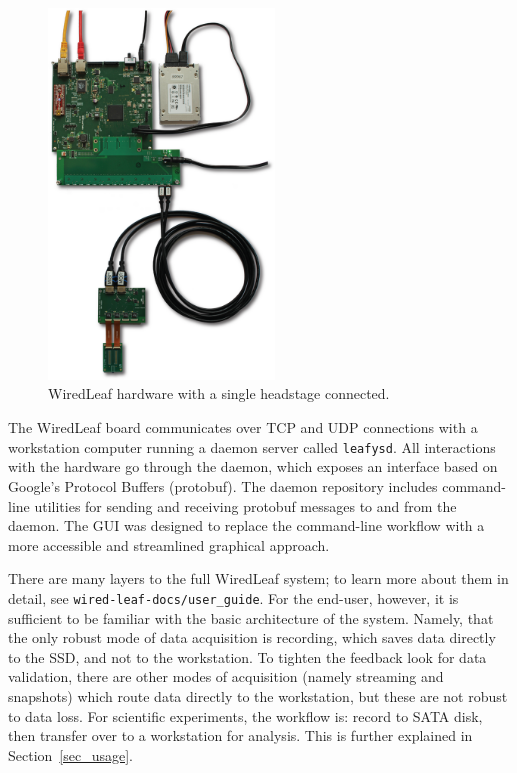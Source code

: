 \begin{figure}[h!]
\begin{center}
\includegraphics[width=6cm]{screenshots/full_setup.png}
\end{center}
\caption{WiredLeaf hardware with a single headstage connected.}
\label{fig_hw}
\end{figure}

The WiredLeaf board communicates over TCP and UDP connections with a workstation computer running a daemon server called \texttt{leafysd}. All interactions with the hardware go through the daemon, which exposes an interface based on Google's Protocol Buffers (protobuf). The daemon repository includes command-line utilities for sending and receiving protobuf messages to and from the daemon. The GUI was designed to replace the command-line workflow with a more accessible and streamlined graphical approach.

There are many layers to the full WiredLeaf system; to learn more about them in detail, see \texttt{wired-leaf-docs/user\_guide}. For the end-user, however, it is sufficient to be familiar with the basic architecture of the system. Namely, that the only robust mode of data acquisition is recording, which saves data directly to the SSD, and not to the workstation. To tighten the feedback look for data validation, there are other modes of acquisition (namely streaming and snapshots) which route data directly to the workstation, but these are not robust to data loss. For scientific experiments, the workflow is: record to SATA disk, then transfer over to a workstation for analysis. This is further explained in Section~\ref{sec_usage}.

